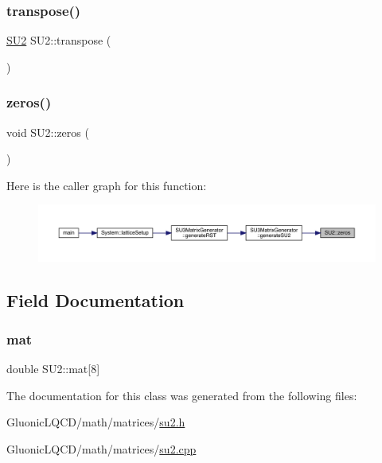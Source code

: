 \subsubsection{\texorpdfstring{transpose()}{transpose()}}
{\footnotesize\ttfamily \mbox{\hyperlink{class_s_u2}{S\+U2}} S\+U2\+::transpose (\begin{DoxyParamCaption}{ }\end{DoxyParamCaption})}

\mbox{\label{class_s_u2_a348ca5d38346892060a05f7d9de02916}} 
\subsubsection{\texorpdfstring{zeros()}{zeros()}}
{\footnotesize\ttfamily void S\+U2\+::zeros (\begin{DoxyParamCaption}{ }\end{DoxyParamCaption})\hspace{0.3cm}{\ttfamily [inline]}}

Here is the caller graph for this function\+:
\nopagebreak
\begin{figure}[H]
\begin{center}
\leavevmode
\includegraphics[width=350pt]{class_s_u2_a348ca5d38346892060a05f7d9de02916_icgraph}
\end{center}
\end{figure}


\subsection{Field Documentation}
\mbox{\label{class_s_u2_ad4227484be245b63489c44a2bc02a625}} 
\subsubsection{\texorpdfstring{mat}{mat}}
{\footnotesize\ttfamily double S\+U2\+::mat\mbox{[}8\mbox{]}}



The documentation for this class was generated from the following files\+:\begin{DoxyCompactItemize}
\item 
Gluonic\+L\+Q\+C\+D/math/matrices/\mbox{\hyperlink{su2_8h}{su2.\+h}}\item 
Gluonic\+L\+Q\+C\+D/math/matrices/\mbox{\hyperlink{su2_8cpp}{su2.\+cpp}}\end{DoxyCompactItemize}
